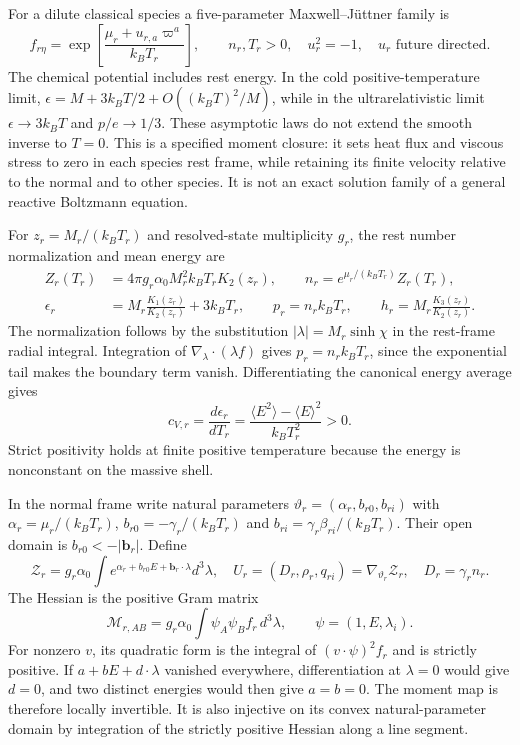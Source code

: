 For a dilute classical species a five-parameter Maxwell--J\"uttner family is
\begin{equation}
 f_{r\eta}=\exp\left[\frac{\mu_r+u_{r,a}\varpi^a}{k_BT_r}\right],
 \qquad n_r,T_r>0,\quad u_r^2=-1,\quad u_r\text{ future directed}.
 \label{ii:juttner}
\end{equation}
The chemical potential includes rest energy. In the cold positive-temperature limit, $\epsilon=M+3k_BT/2+O((k_BT)^2/M)$, while in the ultrarelativistic limit $\epsilon\to3k_BT$ and $p/e\to1/3$. These asymptotic laws do not extend the smooth inverse to $T=0$. This is a specified moment closure: it sets heat flux and viscous stress to zero in each species rest frame, while retaining its finite velocity relative to the normal and to other species. It is not an exact solution family of a general reactive Boltzmann equation.

For $z_r=M_r/(k_BT_r)$ and resolved-state multiplicity $g_r$, the rest number normalization and mean energy are
\begin{align}
 Z_r(T_r)&=4\pi g_r\alpha_0M_r^2k_BT_rK_2(z_r),\qquad
 n_r=e^{\mu_r/(k_BT_r)}Z_r(T_r),\nonumber\\
 \epsilon_r&=M_r\frac{K_1(z_r)}{K_2(z_r)}+3k_BT_r,\qquad
 p_r=n_rk_BT_r,\qquad
 h_r=M_r\frac{K_3(z_r)}{K_2(z_r)}.
 \label{ii:juttner_moments}
\end{align}
The normalization follows by the substitution $|\lambda|=M_r\sinh\chi$ in the rest-frame radial integral. Integration of $\nabla_\lambda\cdot(\lambda f)$ gives $p_r=n_rk_BT_r$, since the exponential tail makes the boundary term vanish. Differentiating the canonical energy average gives
\begin{equation}
 c_{V,r}=\frac{d\epsilon_r}{dT_r}
 =\frac{\langle E^2\rangle-\langle E\rangle^2}{k_BT_r^2}>0.
 \label{ii:heat_capacity}
\end{equation}
Strict positivity holds at finite positive temperature because the energy is nonconstant on the massive shell.

In the normal frame write natural parameters
$\vartheta_r=(\alpha_r,b_{r0},b_{ri})$ with
$\alpha_r=\mu_r/(k_BT_r)$,
$b_{r0}=-\gamma_r/(k_BT_r)$ and
$b_{ri}=\gamma_r\beta_{ri}/(k_BT_r)$.
Their open domain is $b_{r0}<-|\boldsymbol b_r|$. Define
\begin{equation}
 \mathcal Z_r=g_r\alpha_0\int
 e^{\alpha_r+b_{r0}E+\boldsymbol b_r\cdot\lambda}d^3\lambda,
 \quad U_r=(D_r,\rho_r,q_{ri})=\nabla_{\vartheta_r}\mathcal Z_r,
 \quad D_r=\gamma_rn_r.
 \label{ii:moment_inverse}
\end{equation}
The Hessian is the positive Gram matrix
\begin{equation}
 \mathcal M_{r,AB}=g_r\alpha_0\int\psi_A\psi_Bf_r\,d^3\lambda,
 \qquad \psi=(1,E,\lambda_i).
 \label{ii:moment_hessian}
\end{equation}
For nonzero $v$, its quadratic form is the integral of $(v\cdot\psi)^2f_r$ and is strictly positive. If $a+bE+d\cdot\lambda$ vanished everywhere, differentiation at $\lambda=0$ would give $d=0$, and two distinct energies would then give $a=b=0$. The moment map is therefore locally invertible. It is also injective on its convex natural-parameter domain by integration of the strictly positive Hessian along a line segment.

